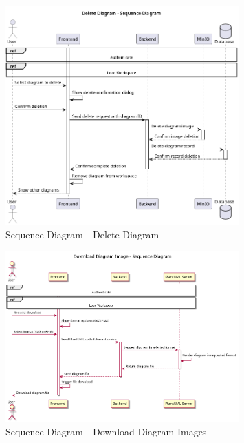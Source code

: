 \begin{figure}[H]
\centering
\includegraphics[width=0.8\textwidth]{conception/SprintIV/sequence_diagrams/sequence_diagramManagement_4_4_DeleteDiagram.png}
\caption{Sequence Diagram - Delete Diagram}
\end{figure}

\begin{figure}[H]
\centering
\includegraphics[width=0.8\textwidth]{conception/SprintIV/sequence_diagrams/sequence_workspaceManagement_4_5_DownloadDiagramImages.png}
\caption{Sequence Diagram - Download Diagram Images}
\end{figure}

